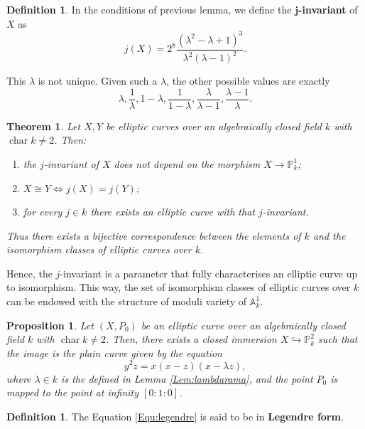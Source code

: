 \documentclass{report}
\DeclareMathOperator{\chara}{char}
\newtheorem{theorem}[equation]{Theorem}
\newtheorem{proposition}[equation]{Proposition}
\theoremstyle{definition}
\newtheorem{definition}[equation]{Definition}
\begin{document}
\begin{definition}
\label{Def:j-invariant}
In the conditions of previous lemma, we define the \textbf{$\boldsymbol{j}$-invariant} of $X$ as
\[j(X)=2^8\frac{(\lambda^2-\lambda+1)^3}{\lambda^2(\lambda-1)^2}.\]

This $\lambda$ is not unique. Given such a $\lambda$, the other possible values are exactly
\[\lambda,\frac{1}{\lambda},1-\lambda,\frac{1}{1-\lambda},\frac{\lambda}{\lambda-1},\frac{\lambda-1}{\lambda}.\]
\end{definition}

\begin{theorem}
Let $X,Y$ be elliptic curves over an algebraically closed field $k$ with $\chara k\neq2$. Then:
\begin{enumerate}
\item the $j$-invariant of $X$ does not depend on the morphism $X\rightarrow\mathbb{P}_k^1$;
\item $X\cong Y\Leftrightarrow j(X)=j(Y)$;
\item for every $j\in k$ there exists an elliptic curve with that $j$-invariant.
\end{enumerate}

Thus there exists a bijective correspondence between the elements of $k$ and the isomorphism classes of elliptic curves over $k$.
\end{theorem}

Hence, the $j$-invariant is a parameter that fully characterises an elliptic curve up to isomorphism. This way, the set of isomorphism classes of elliptic curves over $k$ can be endowed with the structure of moduli variety of $\mathbb{A}_k^1$.

\begin{proposition}
Let $(X,P_0)$ be an elliptic curve over an algebraically closed field $k$ with $\chara k\neq2$. Then, there exists a closed immersion $X\hookrightarrow\mathbb{P}_k^2$ such that the image is the plain curve given by the equation
\begin{equation}
\label{Equ:legendre}
y^2z=x(x-z)(x-\lambda z),
\end{equation}
where $\lambda\in k$ is the defined in Lemma \ref{Lem:lambdarama}, and the point $P_0$ is mapped to the point at infinity $[0:1:0]$.
\end{proposition}

\begin{definition}
The Equation \eqref{Equ:legendre} is said to be in \textbf{Legendre form}.
\end{definition}
\end{document}
